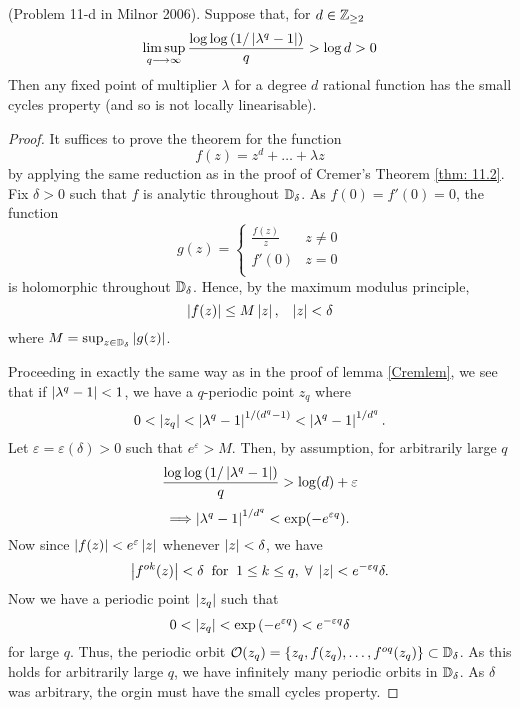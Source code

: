 \documentclass[../main.tex]{subfiles}
\begin{document}
\begin{thm}(Problem 11-d in Milnor 2006).
Suppose that, for $d \in \mathbb{Z}_{\geq 2}$
\begin{equation}
    \limsup_{q \longrightarrow \infty}{\frac{\log{\log{(1/\ensuremath{\left|\lambda^q - 1\right|})}}}{q}} > \log{d} > 0
\end{equation}
Then any fixed point of multiplier $\lambda$ for a degree $d$ rational function has the small cycles property (and so is not locally linearisable).
\end{thm}
\begin{proof}
It suffices to prove the theorem for the function
\[
f(z) = z^d + \dots + \lambda z
\]
by applying the same reduction as in the proof of Cremer's Theorem \eqref{thm: 11.2}. 
Fix $\delta > 0$ such that $f$ is analytic throughout $\mathbb{D}_{\delta}$. As $f(0) = f'(0) = 0$, the function 
\[
g(z) = 
\begin{cases} 
      \frac{f(z)}{z} & z\neq 0 \\
      f'(0) & z = 0 \\
\end{cases}
\]
is holomorphic throughout $\mathbb{D}_{\delta}$. Hence, by the maximum modulus principle,
\[
\left|f(z)\right| \leq M \left|z\right|,\;\;\; \left|z\right| < \delta
\]
where $M = \sup_{z \in \mathbb{D}_{\delta}}\left|g(z)\right|$.

Proceeding in exactly the same way as in the proof of lemma \eqref{Cremlem}, we see that if $\left|\lambda^q - 1\right| < 1$, we have a $q$-periodic point $z_q$ where
\[
0 < \left|z_q\right| < \left|\lambda^q - 1\right|^{1/(d^q - 1)} < \left|\lambda^q - 1\right|^{1/d^q}.
\]
Let $\varepsilon = \varepsilon(\delta) > 0$ such that $e^{\varepsilon} > M$. Then, by assumption, for arbitrarily large $q$
\[
\frac{\log{\log{(1/\ensuremath{\left|\lambda^q - 1\right|})}}}{q} > \log(d) + \varepsilon 
\]
\[
\Longrightarrow \left|\lambda^q - 1\right|^{1/d^q} < \exp(-e^{\varepsilon q}).
\]
Now since $\left|f(z)\right| < e^{\varepsilon}\left|z\right|$ whenever $\left|z\right| < \delta$, we have
\[
\left|f^{ok}(z)\right| < \delta\;\; \text{for}\;\; 1 \leq k \leq q,\; \forall\; \left|z\right| < e^{-\varepsilon q}\delta.
\]
Now we have a periodic point $\left|z_q\right|$ such that
\[
0 < \left|z_q\right| < \exp{\left(- e^{\varepsilon q}\right)} < e^{-\varepsilon q}\delta
\]
for large $q$. Thus, the periodic orbit $\mathcal{O}(z_q) = \left\{z_q, f(z_q), \dots, f^{oq}(z_q)\right\} \subset \mathbb{D}_{\delta}$. As this holds for arbitrarily large $q$, we have infinitely many periodic orbits in $\mathbb{D}_{\delta}$. As $\delta$ was arbitrary, the orgin must have the small cycles property.
\end{proof}
\end{document}
